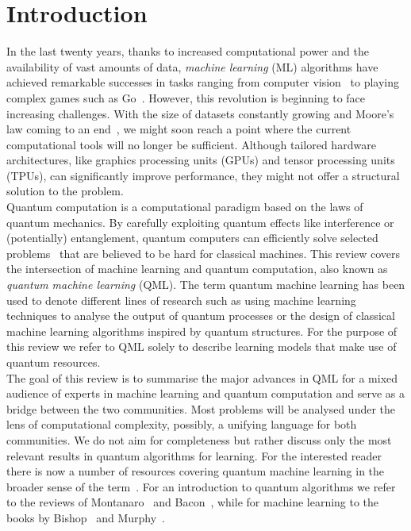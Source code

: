 \documentclass[a4paper, 11pt]{article}
\begin{document}
\tableofcontents





\section{Introduction}

In the last twenty years, thanks to increased computational power and the availability of vast amounts of data, \textit{machine learning} (ML) algorithms have achieved remarkable successes in tasks ranging from computer vision~\cite{krizhevsky2012imagenet} to playing complex games such as Go~\cite{silver2016mastering}. However, this revolution is beginning to face increasing challenges. With the size of datasets constantly growing and Moore's law coming to an end~\cite{markov2014limits}, we might soon reach a point where the current computational tools will no longer be sufficient. Although tailored hardware architectures, like graphics processing units (GPUs) and tensor processing units (TPUs), can significantly improve performance, they might not offer a structural solution to the problem.\\

Quantum computation is a computational paradigm based on the laws of quantum mechanics. By carefully exploiting quantum effects like interference or (potentially) entanglement, quantum computers can efficiently solve selected problems~\cite{shor1997polynomial, van2006quantum, hallgren2007polynomial} that are believed to be hard for classical machines. This review covers the intersection of machine learning and quantum computation, also known as \textit{quantum machine learning} (QML).
The term quantum machine learning has been used to denote different lines of research such as using machine learning techniques to analyse the output of quantum processes or the design of classical machine learning algorithms inspired by quantum structures. For the purpose of this review we refer to QML solely to describe learning models that make use of quantum resources.\\

The goal of this review is to summarise the major advances in QML for a mixed audience of experts in machine learning and quantum computation and serve as a bridge between the two communities. Most problems will be analysed under the lens of computational complexity, possibly, a unifying language for both communities. We do not aim for completeness but rather discuss only the most relevant results in quantum algorithms for learning. For the interested reader there is now a number of resources covering quantum machine learning in the broader sense of the term~\cite{adcock2015advances,biamonte2016quantum}. For an introduction to quantum algorithms we refer to the reviews of Montanaro~\cite{montanaro2016quantum} and Bacon~\cite{bacon2010recent}, while for machine learning to the books by Bishop~\cite{bishop2006pattern} and Murphy~\cite{murphy2012machine}.\\ 
\end{document}
